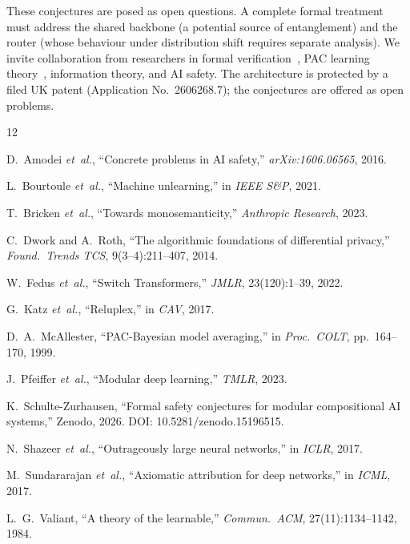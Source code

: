 \documentclass[conference]{IEEEtran}
\begin{document}
These conjectures are posed as open questions. A complete formal treatment must address the shared backbone (a potential source of entanglement) and the router (whose behaviour under distribution shift requires separate analysis). We invite collaboration from researchers in formal verification~\cite{katz2017reluplex}, PAC learning theory~\cite{valiant1984theory}, information theory, and AI safety. The architecture is protected by a filed UK patent (Application No.\ 2606268.7); the conjectures are offered as open problems.

\begin{thebibliography}{12}

D.~Amodei \emph{et~al.}, ``Concrete problems in {AI} safety,'' \emph{arXiv:1606.06565}, 2016.

L.~Bourtoule \emph{et~al.}, ``Machine unlearning,'' in \emph{IEEE S\&P}, 2021.

T.~Bricken \emph{et~al.}, ``Towards monosemanticity,'' \emph{Anthropic Research}, 2023.

C.~Dwork and A.~Roth, ``The algorithmic foundations of differential privacy,'' \emph{Found.\ Trends TCS}, 9(3--4):211--407, 2014.

W.~Fedus \emph{et~al.}, ``Switch {T}ransformers,'' \emph{JMLR}, 23(120):1--39, 2022.

G.~Katz \emph{et~al.}, ``Reluplex,'' in \emph{CAV}, 2017.

D.~A.~McAllester, ``{PAC}-{B}ayesian model averaging,'' in \emph{Proc.\ COLT}, pp.~164--170, 1999.

J.~Pfeiffer \emph{et~al.}, ``Modular deep learning,'' \emph{TMLR}, 2023.

K.~Schulte-Zurhausen, ``Formal safety conjectures for modular compositional {AI} systems,'' Zenodo, 2026. DOI: 10.5281/zenodo.15196515.

N.~Shazeer \emph{et~al.}, ``Outrageously large neural networks,'' in \emph{ICLR}, 2017.

M.~Sundararajan \emph{et~al.}, ``Axiomatic attribution for deep networks,'' in \emph{ICML}, 2017.

L.~G.~Valiant, ``A theory of the learnable,'' \emph{Commun.\ ACM}, 27(11):1134--1142, 1984.

\end{thebibliography}
\end{document}
